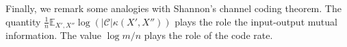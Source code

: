 Finally, we remark some analogies with Shannon's channel coding theorem. The quantity $\frac{1}{n}\mathbb{E}_{X', X''}\log\left(\left|\mathcal{C}\right|\kappa\left(X', X''\right)\right)$ plays the role the input-output mutual information. The value $\log m / n$ plays the role of the code rate.
%
%
%
%
%
